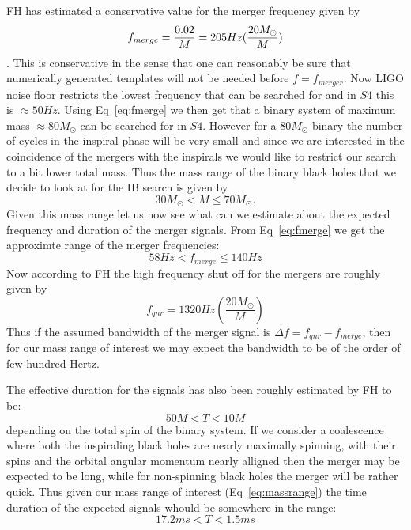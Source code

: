 FH has estimated a conservative value for the merger frequency given
by 
\begin{equation}
f_{merge} = \frac{0.02}{M} \\
          = 205 Hz (\frac{20M_{\odot}}{M})
\label{eq:fmerge}
\end{equation}.
This is conservative in the sense that one can reasonably be sure that
numerically generated templates will not be needed before $f = f_{merger}$.
Now LIGO noise floor restricts the lowest frequency that can be searched 
for and in $S4$ this is $\approx 50 Hz$. Using Eq~\ref{eq:fmerge} we 
then get that a binary system of maximum mass $\approx 80M_{\odot}$ 
can be searched for in $S4$.  However for a $80 M_{\odot}$ binary the 
number of cycles in the inspiral phase will be very small and since we
are interested in the coincidence of the mergers with the inspirals we
would like to restrict our search to a bit lower total mass.  Thus the 
mass range of the binary black holes that we decide to look at for the 
IB search is given by 
\begin{equation}
30 M_{\odot} < M \leq 70 M_{\odot}. 
\label{eq:massrange}
\end{equation}
Given this mass range let us now see what can we estimate about the 
expected frequency and duration of the merger signals. From 
Eq~\ref{eq:fmerge} we get the approximte range of the merger frequencies:
\begin{equation}
58 Hz < f_{merge} \leq 140 Hz
\label{eq:frange}
\end{equation}
Now according to FH the high frequency shut off for the mergers are
roughly given by 
\begin{equation}
f_{qnr} = 1320 Hz (\frac{20M_{\odot}}{M})
\label{eq:fqnr}
\end{equation}
Thus if the assumed bandwidth of the merger signal is 
$\Delta f = f_{qnr} - f_{merge}$,  then for our mass range of 
interest we may expect the bandwidth to be of the order of few
hundred Hertz.  

The effective duration for the signals has also been roughly estimated
by FH to be:
\begin{equation}
50 M < T < 10 M
\label{eq:timerange}
\end{equation}
depending on the total spin of the binary system. If we consider
a coalescence where both the inspiraling black holes are nearly
maximally spinning, with their spins and the orbital angular momentum
nearly alligned then the merger may be expected to be long,  while
for non-spinning black holes the merger will be rather quick.  Thus 
given our mass range of interest (Eq~\ref{eq:massrange}) the 
time duration of the expected signals whould be somewhere in the 
range:
\begin{equation}
17.2 ms < T < 1.5 ms
\label{eq:trange}
\end{equation} 
  
